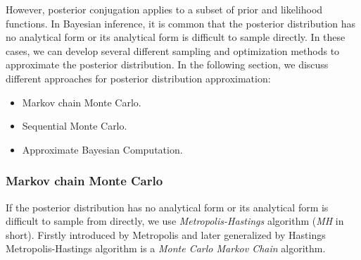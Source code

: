 However, posterior conjugation applies to a subset of prior and likelihood functions. In Bayesian
inference, it is common that the posterior distribution has no analytical form or its analytical
form is difficult to sample directly. In these cases, we can develop several different sampling and
optimization methods to approximate the posterior distribution. In the following section, we discuss
different approaches for posterior distribution approximation:
\begin{itemize}
    \item Markov chain Monte Carlo.
    \item Sequential Monte Carlo.
    \item Approximate Bayesian Computation.
\end{itemize}

\subsubsection{Markov chain Monte Carlo}
If the posterior distribution has no analytical form or its analytical form is difficult to
sample from directly, we use \textit{Metropolis-Hastings} algorithm  (\textit{MH} in short). Firstly
introduced by Metropolis \cite{metropolis1953equation} and later generalized by Hastings
\cite{hastings1970monte} Metropolis-Hastings algorithm is a \textit{Monte Carlo Markov Chain}
algorithm.

